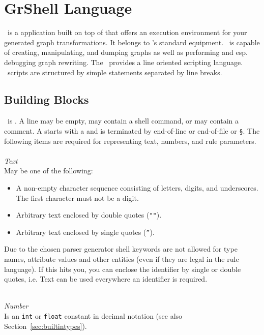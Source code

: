 \chapter{GrShell Language}
\label{chapgrshell}
\GrShell\ is a  application built on top of \LibGr{} that offers an execution environment for your generated graph transformations.
It belongs to \GrG's standard equipment.
\GrShell\ is capable of creating, manipulating, and dumping graphs as well as performing and esp. debugging graph rewriting.
The \GrShell\ provides a line oriented scripting language.
\GrShell\ scripts are structured by simple statements separated by line breaks.



\section{Building Blocks}

\GrShell\ is .
A line may be empty, may contain a shell command, or may contain a comment.
A  starts with a \indexed{\texttt{\#}} and is terminated by end-of-line
 or end-of-file or \texttt{\S}.
The following items are required for representing text, numbers, and rule parameters.\\
\\
\emph{Text}\\
May be one of the following:
\begin{itemize}
  \item A non-empty character sequence consisting of letters, digits, and underscores. The first character must not be a digit.
  \item Arbitrary text enclosed by double quotes (\texttt{""}).
  \item Arbitrary text enclosed by single quotes (\texttt{''}).
\end{itemize}
Due to the chosen parser generator shell keywords are not allowed for type names, attribute values and other entities (even if they are legal in the rule language). If this hits you, you can enclose the identifier by single or double quotes, i.e. Text can be used everywhere an identifier is required.

\mbox{ }\\
\emph{Number}\\
Is an \texttt{int} or \texttt{float} constant in decimal notation (see also Section~\ref{sec:builtintypes}).


